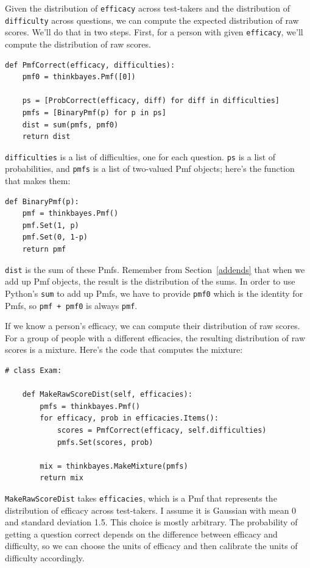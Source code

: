 \documentclass[12pt]{book}
\begin{document}
Given the distribution of {\tt efficacy} across test-takers
and the distribution of {\tt difficulty} across questions, we
can compute the expected distribution of raw scores.  We'll do that
in two steps.  First, for a person with given {\tt efficacy},
we'll compute the distribution of raw scores.

\begin{verbatim}
def PmfCorrect(efficacy, difficulties):
    pmf0 = thinkbayes.Pmf([0])

    ps = [ProbCorrect(efficacy, diff) for diff in difficulties]
    pmfs = [BinaryPmf(p) for p in ps]
    dist = sum(pmfs, pmf0)
    return dist
\end{verbatim}

{\tt difficulties} is a list of difficulties, one for each question.
{\tt ps} is a list of probabilities, and {\tt pmfs} is a list of
two-valued Pmf objects; here's the function that makes them:

\begin{verbatim}
def BinaryPmf(p):
    pmf = thinkbayes.Pmf()
    pmf.Set(1, p)
    pmf.Set(0, 1-p)
    return pmf
\end{verbatim}

{\tt dist} is the sum of these Pmfs.  Remember from Section~\ref{addends}
that when we add up Pmf objects, the result is the distribution
of the sums.  In order to use Python's {\tt sum} to add up Pmfs,
we have to provide {\tt pmf0} which is the identity for Pmfs,
so {\tt pmf + pmf0} is always {\tt pmf}.

If we know a person's efficacy, we can compute their distribution
of raw scores.  For a group of people with a different efficacies, the
resulting distribution of raw scores is a mixture.  Here's the code
that computes the mixture:

\begin{verbatim}
# class Exam:

    def MakeRawScoreDist(self, efficacies):
        pmfs = thinkbayes.Pmf()
        for efficacy, prob in efficacies.Items():
            scores = PmfCorrect(efficacy, self.difficulties)
            pmfs.Set(scores, prob)

        mix = thinkbayes.MakeMixture(pmfs)
        return mix
\end{verbatim}

{\tt MakeRawScoreDist} takes {\tt efficacies}, which is a Pmf that
represents the distribution of efficacy across test-takers.  I assume
it is Gaussian with mean 0 and standard deviation 1.5.  This
choice is mostly arbitrary.  The probability of getting a question
correct depends on the difference between efficacy and difficulty, so
we can choose the units of efficacy and then calibrate the units of
difficulty accordingly.  
\end{document}
